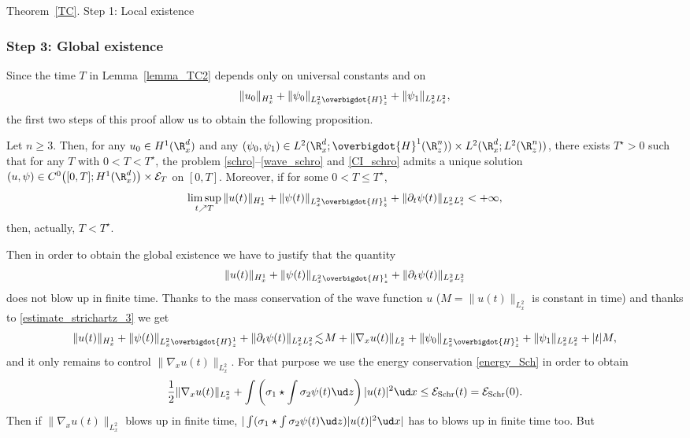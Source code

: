 \begin{ProofOf}{Theorem~\ref{TC}. Step 1: Local existence}
\subsubsection*{Step 3: Global existence} Since the time $T$ in Lemma~\ref{lemma_TC2} depends only on universal constants and on\vspace*{-3pt}
\[
\|u_{0}\|_{H_{x}^{1}}+\|\psi_{0}\|_{L_{x}^{2}\overbigdot{H}_{z}^{1}}+\|\psi_{1}\|_{L_{x}^{2}L_{z}^{2}},
\]
the first two steps of this proof allow us to obtain the following proposition.
\begin{proposition}
Let $n\geq 3$. Then, for any $u_{0}\in H^{1}(\R_{x}^{d})$ and any $(\psi_{0},\psi_{1})\in L^{2}(\R_{x}^{d};\overbigdot{H}^{1}(\R_{z}^{n}))\times L^{2}(\R_{x}^{d};L^{2}(\R_{z}^{n}))$, there exists $T^{\star}>0$ such that for any $T$ with $0<T<T^{\star}$, the problem \eqref{schro}--\eqref{wave_schro} and \eqref{CI_schro} admits a unique solution \hbox{$(u,\psi)\in C^{0}\bigl([0,T];H^{1}(\R_{x}^{d})\bigr)\times\mathcal{E}_{T}$} on $[0,T]$. Moreover, if for some $0<T\leq T^{\star}$,
\[
\underset{t\nearrow T}{\limsup}\,\|u(t)\|_{H_{x}^{1}}+\|\psi(t)\|_{L_{x}^{2}\overbigdot{H}_{z}^{1}}+\|\partial_{t}\psi(t)\|_{L_{x}^{2}L_{z}^{2}}<+\infty,
\]
then, actually, $T<T^{\star}$.
\end{proposition}
Then in order to obtain the global existence we have to justify that the quantity
\[
\|u(t)\|_{H_{x}^{1}}+\|\psi(t)\|_{L_{x}^{2}\overbigdot{H}_{z}^{1}}+\|\partial_{t}\psi(t)\|_{L_{x}^{2}L_{z}^{2}}
\]
does not blow up in finite time. Thanks to the mass conservation of the wave function $u$ ($M=\|u(t)\|_{L_{x}^{2}}$ is constant in time) and thanks to \eqref{estimate_strichartz_3} we get
\[
\|u(t)\|_{H_{x}^{1}}+\|\psi(t)\|_{L_{x}^{2}\overbigdot{H}_{z}^{1}}+\|\partial_{t}\psi(t)\|_{L_{x}^{2}L_{z}^{2}}\!\lesssim\! M+\|\nabla_{x}u(t)\|_{L_{x}^{2}}+\|\psi_{0}\|_{L_{x}^{2}\overbigdot{H}_{z}^{1}}+\|\psi_{1}\|_{L_{x}^{2}L_{z}^{2}}+|t|M,
\]
and it only remains to control $\|\nabla_{x}u(t)\|_{L_{x}^{2}}$. For that purpose we use the energy conservation
\eqref{energy_Sch}
in order to obtain
\[
\frac{1}{2}\|\nabla_{x}u(t)\|_{L_{x}^{2}}+\int\left(\sigma_{1}\star\int\sigma_{2}\psi(t)\ud z\right)|u(t)|^{2}\ud x\leq \mathcal E_{\mathrm {Schr}}(t)= \mathcal E_{\mathrm {Schr}}(0).
\]
Then if $\|\nabla_{x}u(t)\|_{L_{x}^{2}}$ blows up in finite time, $|\int(\sigma_{1}\star\int\sigma_{2}\psi(t)\ud z)|u(t)|^{2}\ud x|$ has to blows up in finite time too. But
\begin{equation}\label{estimate_utile}
\begin{split}

\end{split}
\end{equation}
\end{ProofOf}
